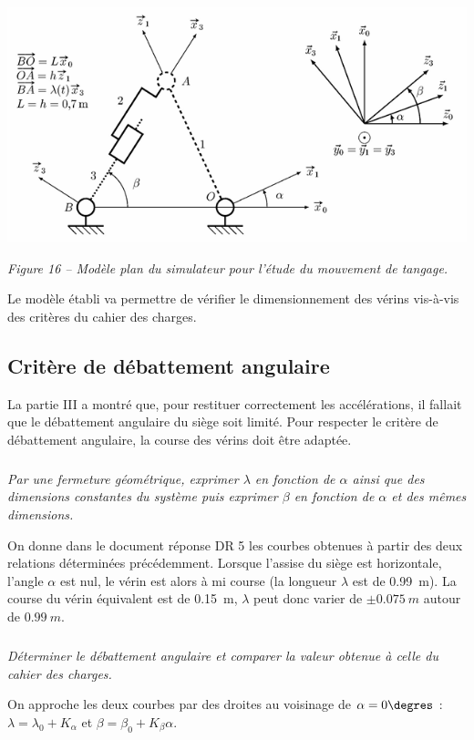 \documentclass[10pt,fleqn]{article} %
\begin{document}
\begin{center}
\includegraphics[width=.9\linewidth]{images/fig_16}

\textit{Figure 16 -- Modèle plan du simulateur pour l'étude du mouvement de tangage.}
\end{center}

Le modèle établi va permettre de vérifier le dimensionnement des vérins vis-à-vis des critères du cahier des charges. 


\subsection{Critère de débattement angulaire}

La partie III a montré que, pour restituer correctement les accélérations, il fallait que le débattement angulaire du siège soit limité. Pour respecter le critère de débattement angulaire, la course des vérins doit être adaptée. 

\subparagraph{}
\textit{Par une fermeture géométrique, exprimer $\lambda$ en fonction de $\alpha$ ainsi que des dimensions constantes du système puis exprimer $\beta$ en fonction de $\alpha$ et des mêmes dimensions.}
 
On donne dans le document réponse DR 5 les courbes obtenues à partir des deux relations déterminées précédemment. Lorsque l'assise du siège est horizontale, l'angle $\alpha$ est nul, le vérin est alors à mi course (la longueur $\lambda$ est de \SI{0,99}{m}). La course du vérin équivalent est de \SI{0,15}{m}, $\lambda$ peut donc varier de $\pm \SI{0,075}{m}$ autour de $\SI{0,99}{m}$. 

\subparagraph{}
\textit{Déterminer le débattement angulaire et comparer la valeur obtenue à celle du cahier des charges.}





On approche les deux courbes par des droites au voisinage de $\alpha=0\degres$ : $\lambda = \lambda_0 + K_{\alpha}$ et $\beta = \beta_0 + K_{\beta} \alpha$. 
\end{document}
